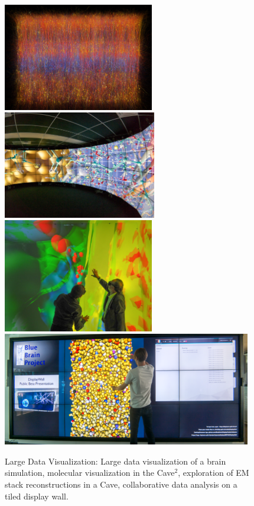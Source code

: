 \begin{figure}[h!t]
 \includegraphics[height=4.7cm]{images/slices}\hfil%
 \includegraphics[height=4.7cm]{images/cave2}\\%
 \includegraphics[height=4.95cm]{images/cave}\hfil%
 \includegraphics[height=4.95cm]{images/tide}%
 \caption{\label{FIG_teaser}Large Data Visualization: Large data visualization of a
  brain simulation, molecular visualization in the Cave$^2$, exploration of EM
  stack reconstructions in a Cave, collaborative data analysis on a tiled
  display wall.}
\end{figure}

